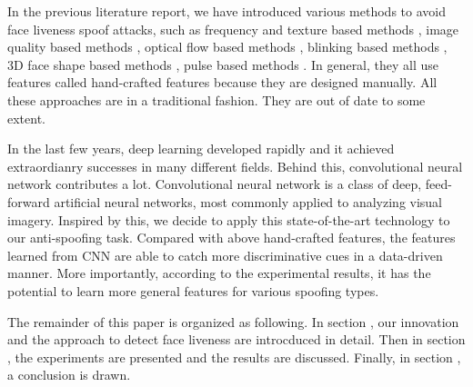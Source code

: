 \documentclass[journal]{IEEEtran}
\begin{document}
In the previous literature report, we have introduced various methods to avoid face liveness spoof attacks, such as frequency and texture based methods \cite{chingovska2012effectiveness} \cite{maatta2011face}, image quality based methods \cite{wen2015face}, optical flow based methods \cite{Bao2009A}, blinking based methods \cite{pan2007eyeblink}, 3D face shape based methods \cite{lagorio2013liveness}, pulse based methods \cite{erdogmus2014spoofing}. In general, they all use features called hand-crafted features because they are designed manually. All these approaches are in a traditional fashion. They are out of date to some extent.

In the last few years, deep learning developed rapidly and it achieved extraordianry successes in many different fields. Behind this, convolutional neural network contributes a lot. Convolutional neural network is a class of deep, feed-forward artificial neural networks, most commonly applied to analyzing visual imagery. Inspired by this, we decide to apply this state-of-the-art technology to our anti-spoofing task. Compared with above hand-crafted features, the features learned from CNN are able to catch more discriminative cues in a data-driven manner. More importantly, according to the experimental results, it has the potential to learn more general features for various spoofing types.

The remainder of this paper is organized as following. In section \uppercase\expandafter{}, our innovation and the approach to detect face liveness are introcduced in detail. Then in section \uppercase\expandafter{}, the experiments are presented and the results are discussed. Finally, in section \uppercase\expandafter{}, a conclusion is drawn.


%
%
\end{document}
